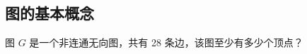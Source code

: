 \subsection{图的基本概念}

\begin{qitems}
    \begin{bbox}
        \qitem 图 $G$ 是一个非连通无向图，共有 28 条边，该图至少有多少个顶点？
    \end{bbox}
\end{qitems} 